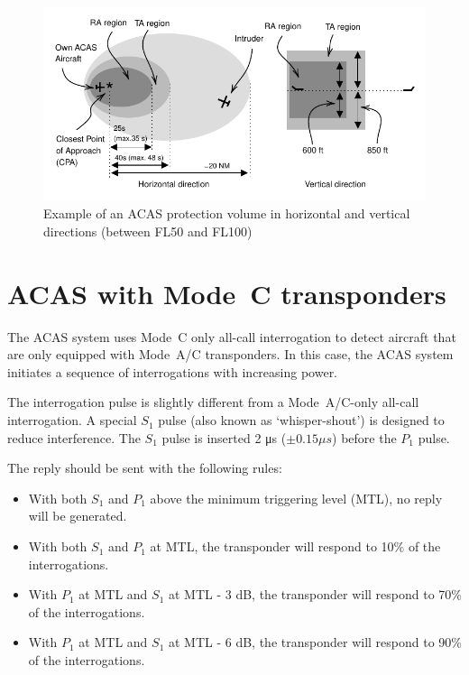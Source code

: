 \begin{figure}[ht]
\centering
\includegraphics[scale=0.9]{figures/mode_s/acas_regions.pdf}
\caption{Example of an ACAS protection volume in horizontal and vertical directions (between FL50 and FL100)}
\label{fig:acas_regions}
\end{figure}




\section{ACAS with Mode~C transponders}

The ACAS system uses Mode~C only all-call interrogation to detect aircraft that are only equipped with Mode~A/C transponders. In this case, the ACAS system initiates a sequence of interrogations with increasing power.

The interrogation pulse is slightly different from a Mode~A/C-only all-call interrogation. A special $S_1$ pulse (also known as `whisper-shout') is designed to reduce interference. The $S_1$ pulse is inserted 2  μs ($\pm 0.15 \mu s$) before the $P_1$ pulse.

The reply should be sent with the following rules:

\begin{itemize}
  \item With both $S_1$ and $P_1$ above the minimum triggering level (MTL), no reply will be generated.
  \item With both $S_1$ and $P_1$ at MTL, the transponder will respond to 10\% of the interrogations.
  \item With $P_1$ at MTL and $S_1$ at MTL - 3 dB, the transponder will respond to 70\% of the interrogations.
  \item With $P_1$ at MTL and $S_1$ at MTL - 6 dB, the transponder will respond to 90\% of the interrogations.
\end{itemize}

